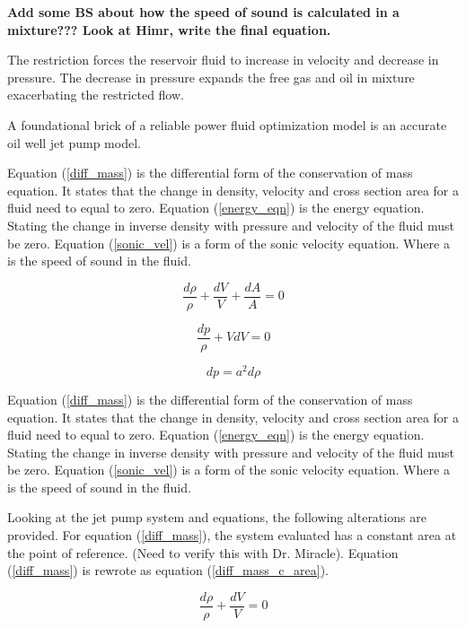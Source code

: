 \documentclass{article}
\begin{document}
\textbf{Add some BS about how the speed of sound is calculated in a mixture??? Look at Himr, write the final equation.}

The restriction forces the reservoir fluid to increase in velocity and decrease in pressure. The decrease in pressure expands the free gas and oil in mixture exacerbating the restricted flow.

A foundational brick of a reliable power fluid optimization model is an accurate oil well jet pump model.

Equation (\ref{diff_mass}) is the differential form of the conservation of mass equation. It states that the change in density, velocity and cross section area for a fluid need to equal to zero. Equation (\ref{energy_eqn}) is the energy equation. Stating the change in inverse density with pressure and velocity of the fluid must be zero. Equation (\ref{sonic_vel}) is a form of the sonic velocity equation. Where a is the speed of sound in the fluid.

\begin{equation}
\frac{d\rho}{\rho} + \frac{dV}{V} + \frac{dA}{A} = 0
\label{diff_mass}
\end{equation}

\begin{equation}
\frac{dp}{\rho} + VdV = 0
\label{energy_eqn}
\end{equation}

\begin{equation}
dp = a^2d\rho
\label{sonic_vel}
\end{equation}

Equation (\ref{diff_mass}) is the differential form of the conservation of mass equation. It states that the change in density, velocity and cross section area for a fluid need to equal to zero. Equation (\ref{energy_eqn}) is the energy equation. Stating the change in inverse density with pressure and velocity of the fluid must be zero. Equation (\ref{sonic_vel}) is a form of the sonic velocity equation. Where a is the speed of sound in the fluid. 

Looking at the jet pump system and equations, the following alterations are provided. For equation (\ref{diff_mass}), the system evaluated has a constant area at the point of reference. (Need to verify this with Dr. Miracle). Equation (\ref{diff_mass}) is rewrote as equation (\ref{diff_mass_c_area}).

\begin{equation}
\frac{d\rho}{\rho} + \frac{dV}{V} = 0
\label{diff_mass_c_area}
\end{equation}
\end{document}

